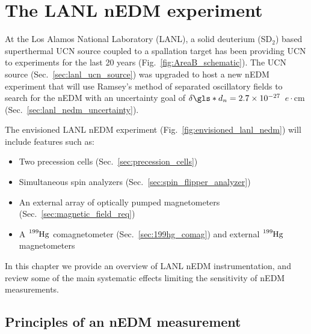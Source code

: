
\chapter{The LANL nEDM experiment}\label{chap:LANL_nEDM}


At the Los Alamos National Laboratory (LANL), a solid deuterium (SD$_2$) based superthermal UCN source coupled to a spallation target has been providing UCN to experiments for the last 20 years (Fig.~\ref{fig:AreaB_schematic}). The UCN source (Sec.~\ref{sec:lanl_ucn_source}) was upgraded to host a new nEDM experiment that will use Ramsey's method of separated oscillatory fields to search for the nEDM with an uncertainty goal of $\delta \gls*{d_n} = 2.7\times 10^{-27}$~$e\cdot\text{cm}$ (Sec.~\ref{sec:lanl_nedm_uncertainty}).

The envisioned LANL nEDM experiment (Fig.~\ref{fig:envisioned_lanl_nedm}) will include features such as:
%
\begin{itemize}
    \item Two precession cells (Sec.~\ref{sec:precession_cells})
    \item Simultaneous spin analyzers (Sec.~\ref{sec:spin_flipper_analyzer})
    \item An external array of optically pumped magnetometers (Sec.~\ref{sec:magnetic_field_req})
    \item A $\ce{^{199}Hg}$ comagnetometer (Sec.~\ref{sec:199hg_comag}) and external $\ce{^{199}Hg}$ magnetometers
\end{itemize}

In this chapter we provide an overview of LANL nEDM instrumentation, and review some of the main systematic effects limiting the sensitivity of nEDM measurements.


\section{Principles of an nEDM measurement}\label{sec:principles_nEDM}


